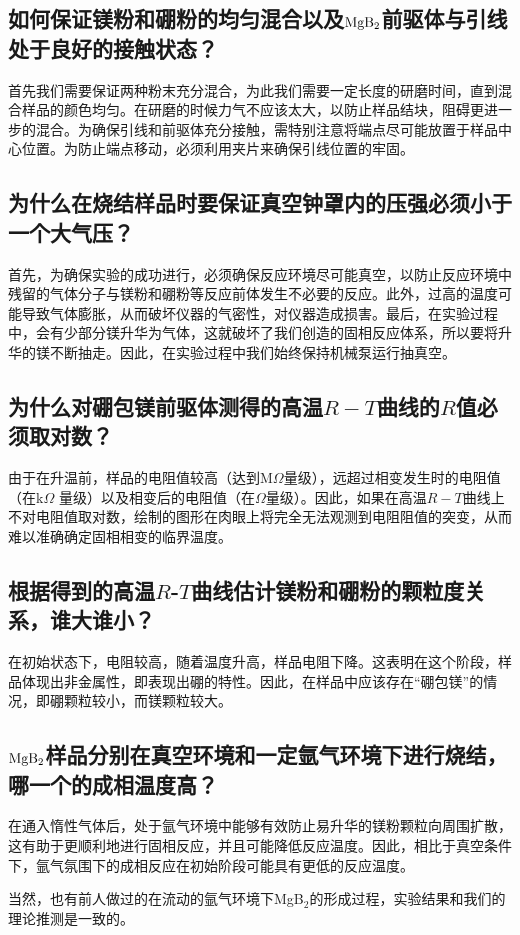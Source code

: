 \documentclass[font=default]{mpltx}
\begin{document}
\subsection{如何保证镁粉和硼粉的均匀混合以及${\rm MgB_2}$前驱体与引线处于良好的接触状态？}
首先我们需要保证两种粉末充分混合，为此我们需要一定长度的研磨时间，直到混合样品的颜色均匀。在研磨的时候力气不应该太大，以防止样品结块，阻碍更进一步的混合。为确保引线和前驱体充分接触，需特别注意将端点尽可能放置于样品中心位置。为防止端点移动，必须利用夹片来确保引线位置的牢固。
\subsection{为什么在烧结样品时要保证真空钟罩内的压强必须小于一个大气压？}
首先，为确保实验的成功进行，必须确保反应环境尽可能真空，以防止反应环境中残留的气体分子与镁粉和硼粉等反应前体发生不必要的反应。此外，过高的温度可能导致气体膨胀，从而破坏仪器的气密性，对仪器造成损害。最后，在实验过程中，会有少部分镁升华为气体，这就破坏了我们创造的固相反应体系，所以要将升华的镁不断抽走。因此，在实验过程中我们始终保持机械泵运行抽真空。
\subsection{为什么对硼包镁前驱体测得的高温$R-T$曲线的$R$值必须取对数？}
由于在升温前，样品的电阻值较高（达到M$\Omega$量级），远超过相变发生时的电阻值（在k$\Omega$ 量级）以及相变后的电阻值（在$\Omega$量级）。因此，如果在高温$R-T$曲线上不对电阻值取对数，绘制的图形在肉眼上将完全无法观测到电阻阻值的突变，从而难以准确确定固相相变的临界温度。
\subsection{根据得到的高温$R$-$T$曲线估计镁粉和硼粉的颗粒度关系，谁大谁小？}
在初始状态下，电阻较高，随着温度升高，样品电阻下降。这表明在这个阶段，样品体现出非金属性，即表现出硼的特性。因此，在样品中应该存在“硼包镁”的情况，即硼颗粒较小，而镁颗粒较大。
\subsection{${\rm MgB_2}$样品分别在真空环境和一定氩气环境下进行烧结，哪一个的成相温度高？}
在通入惰性气体后，处于氩气环境中能够有效防止易升华的镁粉颗粒向周围扩散，这有助于更顺利地进行固相反应，并且可能降低反应温度。因此，相比于真空条件下，氩气氛围下的成相反应在初始阶段可能具有更低的反应温度。

当然，也有前人做过的在流动的氩气环境下MgB$_2$的形成过程，实验结果和我们的理论推测是一致的\cite{Feng}。
\end{document}
